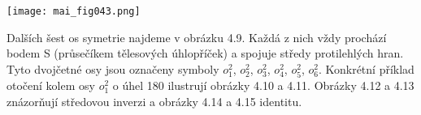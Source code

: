 \begin{mdframed}[style=mdexam]
\begin{example}
    {\centering
      \captionsetup{type=figure}
      \label{mai:fig042}
    \par}

    {\centering
      \captionsetup{type=figure}
      \texttt{[image: mai\_fig043.png]}
      \par}

      Dalších šest os symetrie najdeme v obrázku 4.9. Každá z nich vždy prochází bodem S (průsečíkem
      tělesových úhlopříček) a spojuje středy protilehlých hran. Tyto dvojčetné osy jsou označeny
      symboly \(o_1^2\), \(o_2^2\), \(o_3^2\), \(o_4^2\), \(o_5^2\), \(o_6^2\). Konkrétní příklad
      otočení kolem osy \(o_1^2\) o úhel \SI{180}{\deg} ilustrují obrázky 4.10 a 4.11. Obrázky 4.12
      a 4.13 znázorňují středovou inverzi a obrázky 4.14 a 4.15 identitu.
      

\end{example}
\end{mdframed}
